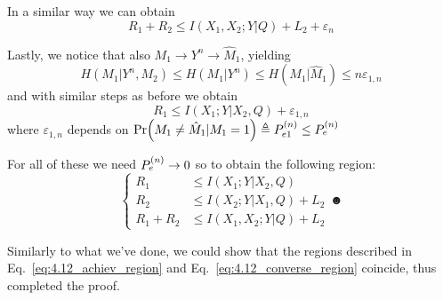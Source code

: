In a similar way we can obtain
%
\begin{equation}
R_1 + R_2 \leq I(X_1,X_2;Y|Q) + L_2 + \varepsilon_n
\end{equation}

Lastly, we notice that also $M_1 \rightarrow Y^n \rightarrow \hat{M}_1$, yielding
%
\begin{equation}
H(M_1|Y^n,M_2) \leq H(M_1|Y^n) \leq H(M_1|\hat{M}_1) \leq n\varepsilon_{1,n}
\end{equation}
%
and with similar steps as before we obtain
%
\begin{equation}
R_1 \leq I(X_1;Y|X_2,Q) + \varepsilon_{1,n}
\end{equation}
%
where $\varepsilon_{1,n}$ depends on $\Pr(M_1 \neq \hat{M}_1|M_1=1) \triangleq P_{e1}^{(n)} \leq  P_e^{(n)} $

For all of these we need $ P_e^{(n)}  \rightarrow 0$ so to obtain the following region:
%
\begin{equation}
\begin{cases}
R_1 &\leq I(X_1;Y|X_2,Q)\\
R_2 &\leq I(X_2;Y|X_1,Q) + L_2\\
R_1+R_2 &\leq I(X_1,X_2;Y|Q) + L_2
\end{cases} \label{eq:4.12_converse_region}☻
\end{equation}

Similarly to what we've done, we could show that the regions described in Eq.~\ref{eq:4.12_achiev_region} and Eq.~\ref{eq:4.12_converse_region} coincide, thus completed the proof.